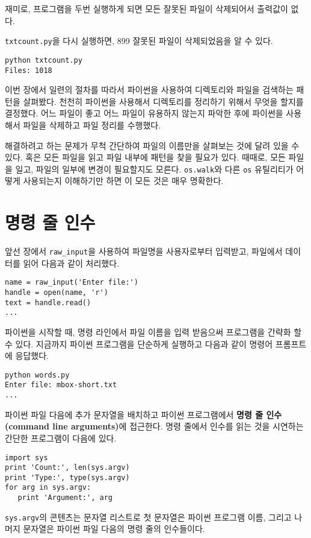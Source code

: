 재미로, 프로그램을 두번 실행하게 되면 모든 잘못된 파일이 삭제되어서 출력값이 없다.

{\tt txtcount.py}을 다시 실행하면, 899 잘못된 파일이 삭제되었음을 알 수 있다.

\beforeverb
\begin{verbatim}
python txtcount.py 
Files: 1018
\end{verbatim}
\afterverb
%

이번 장에서 일련의 절차를 따라서 파이썬을 사용하여 디렉토리와 파일을 검색하는 패턴을 살펴봤다.
천천히 파이썬을 사용해서 디렉토리를 정리하기 위해서 무엇을 할지를 결정했다.
어느 파일이 좋고 어느 파일이 유용하지 않는지 파악한 후에 파이썬을 사용해서 파일을 삭제하고 
파일 정리를 수행했다.

해결하려고 하는 문제가 무척 간단하여 파일의 이름만을 살펴보는 것에 달려 있을 수 있다. 
혹은 모든 파일을 읽고 파일 내부에 패턴을 찾을 필요가 있다.
때때로, 모든 파일을 일고, 파일의 일부에 변경이 필요할지도 모른다. 
{\tt os.walk}와 다른 {\tt os} 유틸리티가 어떻게 사용되는지 이해하기만 하면 이 모든 것은 매우 명확한다.


\section{명령 줄 인수}


앞선 장에서 \verb"raw_input"을 사용하여 파일명을 사용자로부터 입력받고,
파일에서 데이터를 읽어 다음과 같이 처리했다.

\beforeverb
\begin{verbatim}
name = raw_input('Enter file:')
handle = open(name, 'r')
text = handle.read()
...
\end{verbatim}
\afterverb
%

파이썬을 시작할 때, 명령 라인에서 파일 이름을 입력 받음으써 프로그램을 간략화 할 수 있다.
지금까지 파이썬 프로그램을 단순하게 실행하고 다음과 같이 명령어 프롬프트에 응답했다.

\beforeverb
\begin{verbatim}
python words.py
Enter file: mbox-short.txt
...
\end{verbatim}
\afterverb
%

파이썬 파일 다음에 추가 문자열을 배치하고 파이썬 프로그램에서 
{\bf 명령 줄 인수(command line arguments)}에 접근한다.
명령 줄에서 인수를 읽는 것을 시연하는 간단한 프로그램이 다음에 있다.

\beforeverb
\begin{verbatim}
import sys
print 'Count:', len(sys.argv)
print 'Type:', type(sys.argv)
for arg in sys.argv:
   print 'Argument:', arg
\end{verbatim}
\afterverb
%
{\tt sys.argv}의 콘텐츠는 문자열 리스트로 첫 문자열은 파이썬 프로그램 이름,
그리고 나머지 문자열은 파이썬 파일 다음의 명령 줄의 인수들이다.

